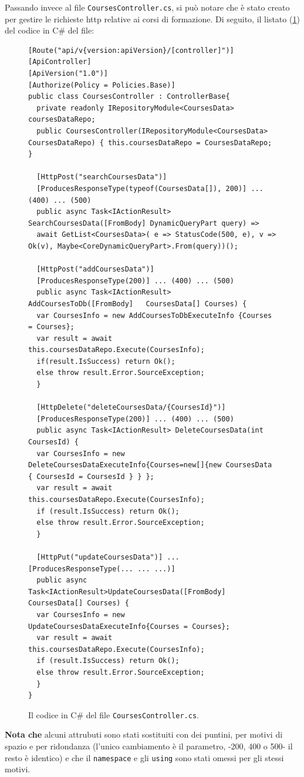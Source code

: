 Passando invece al file \texttt{CoursesController.cs}, si può notare che è stato creato per gestire le richieste \acrshort{http} relative ai corsi di formazione. Di seguito, il listato (\ref{fig:coursescontroller}) del codice in C\# del file:
\begin{figure}[H]
\begin{lstlisting}[linewidth=100cm]
[Route("api/v{version:apiVersion}/[controller]")]
[ApiController]
[ApiVersion("1.0")]
[Authorize(Policy = Policies.Base)]
public class CoursesController : ControllerBase{
  private readonly IRepositoryModule<CoursesData> coursesDataRepo;
  public CoursesController(IRepositoryModule<CoursesData>    CoursesDataRepo) { this.coursesDataRepo = CoursesDataRepo; }

  [HttpPost("searchCoursesData")]
  [ProducesResponseType(typeof(CoursesData[]), 200)] ... (400) ... (500)
  public async Task<IActionResult> SearchCoursesData([FromBody] DynamicQueryPart query) =>
  await GetList<CoursesData>( e => StatusCode(500, e), v => Ok(v), Maybe<CoreDynamicQueryPart>.From(query))();
  
  [HttpPost("addCoursesData")]
  [ProducesResponseType(200)] ... (400) ... (500)
  public async Task<IActionResult> AddCoursesToDb([FromBody]   CoursesData[] Courses) {
  var CoursesInfo = new AddCoursesToDbExecuteInfo {Courses = Courses};
  var result = await this.coursesDataRepo.Execute(CoursesInfo);
  if(result.IsSuccess) return Ok();
  else throw result.Error.SourceException;
  }

  [HttpDelete("deleteCoursesData/{CoursesId}")]
  [ProducesResponseType(200)] ... (400) ... (500)
  public async Task<IActionResult> DeleteCoursesData(int CoursesId) {
  var CoursesInfo = new DeleteCoursesDataExecuteInfo{Courses=new[]{new CoursesData { CoursesId = CoursesId } } };
  var result = await this.coursesDataRepo.Execute(CoursesInfo);
  if (result.IsSuccess) return Ok();
  else throw result.Error.SourceException;
  }
  
  [HttpPut("updateCoursesData")] ... [ProducesResponseType(... ... ...)]
  public async Task<IActionResult>UpdateCoursesData([FromBody]  CoursesData[] Courses) {
  var CoursesInfo = new UpdateCoursesDataExecuteInfo{Courses = Courses};
  var result = await this.coursesDataRepo.Execute(CoursesInfo);
  if (result.IsSuccess) return Ok();
  else throw result.Error.SourceException;
  }  
}
\end{lstlisting}
\caption{\label{fig:coursescontroller}Il codice in C\# del file \texttt{CoursesController.cs}.}
\end{figure}
\textbf{Nota che } alcuni attrubuti sono stati sostituiti con dei puntini, per motivi di spazio e per ridondanza (l'unico cambiamento è il parametro, -200, 400 o 500- il resto è identico) e che il \texttt{namespace} e gli \texttt{using} sono stati omessi per gli stessi motivi. 

